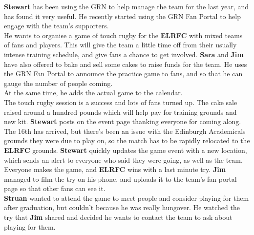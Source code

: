 \documentclass[10pt,a4paper]{article}
\begin{document}
\textbf{Stewart} has been using the GRN to help manage the team for the last year, and has found it very useful. He recently started using the GRN Fan Portal to help engage with the team’s supporters. \\

He wants to organise a game of touch rugby for the \textbf{ELRFC} with mixed teams of fans and players. This will give the team a little time off from their usually intense training schedule, and give fans a chance to get involved. \textbf{Sara} and \textbf{Jim} have also offered to bake and sell some cakes to raise funds for the team. He uses the GRN Fan Portal to announce the practice game to fans, and so that he can gauge the number of people coming. \\

At the same time, he adds the actual game to the calendar. \\

The touch rugby session is a success and lots of fans turned up. The cake sale raised around a hundred pounds which will help pay for training grounds and new kit. \textbf{Stewart} posts on the event page thanking everyone for coming along.\\

The 16th has arrived, but there’s been an issue with the Edinburgh Academicals grounds they were due to play on, so the match has to be rapidly relocated to the \textbf{ELRFC} grounds. \textbf{Stewart} quickly updates the game event with a new location, which sends an alert to everyone who said they were going, as well as the team. Everyone makes the game, and \textbf{ELRFC} wins with a last minute try. \textbf{Jim} managed to film the try on his phone, and uploads it to the team’s fan portal page so that other fans can see it. \\

\textbf{Struan}  wanted to attend the game to meet people and consider playing for them after graduation, but couldn’t because he was really hungover. He watched the try that \textbf{Jim} shared and decided he wants to contact the team to ask about playing for them. \\
\end{document}
